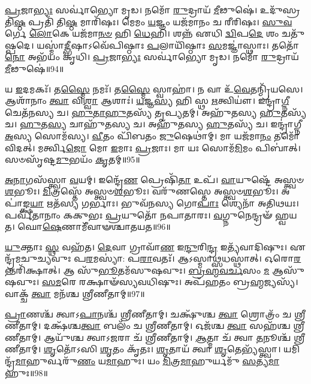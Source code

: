 \-\ul{𑌪𑍍𑌰}\-𑌜𑌾\-\ul{𑌭𑍍𑌯𑌃} 𑌸𑌰𑍍𑌵𑌾॑𑌭𑍍𑌯𑍋 𑌮𑍃𑌡।
𑌨𑌮𑍋᳴ \ul{𑌰𑍁}\-𑌦𑍍𑌰𑌾𑌯᳴ \ul{𑌮𑍀}\-𑌢𑍁𑌷𑍇॑।
𑌉𑌦𑍁᳴𑌸𑍍𑌰 𑌤𑌿\-\ul{𑌷𑍍𑌠} 𑌪𑍍𑌰𑌤𑌿᳴ 𑌤𑌿\-\ul{𑌷𑍍𑌠} 𑌮𑌾𑌰𑌿᳴𑌷𑌃।
𑌮𑍇𑌮𑌂 \ul{𑌯}\-𑌜𑍍𑌞𑌂 𑌯𑌜᳴𑌮𑌾𑌨𑌂 𑌚 𑌰𑍀𑌰𑌿𑌷𑌃।
\-\ul{𑌸𑍁}\-\-\ul{𑌵}\-𑌰𑍍𑌗𑍇 \ul{𑌲𑍋}\-𑌕𑍇 𑌯𑌜᳴𑌮𑌾\-\ul{𑌨}\-\-\ul{𑍞} 𑌹𑌿 \ul{𑌧𑍇}\-𑌹𑌿।
𑌶𑌨𑍍𑌨᳴ 𑌏𑌧𑌿 \ul{𑌦𑍍𑌵𑌿}\-𑌪\-\ul{𑌦𑍇} 𑌶𑌂 𑌚𑌤𑍁᳴𑌷𑍍𑌪𑌦𑍇।
𑌯𑌸𑍍𑌮𑌾॑\-\ul{𑌦𑍍𑌭𑍀}\-𑌷𑌾\-𑌽𑌵𑍇᳴𑌪𑌿𑌷𑍍𑌠𑌾𑌃 \ul{𑌪}\-𑌲𑌾𑌯𑌿᳴𑌷𑍍𑌠𑌾𑌃 \ul{𑌸}\-𑌮𑌜𑍍𑌞𑌾॑𑌸𑍍𑌥𑌾𑌃।
𑌤𑌤𑍋᳴ \ul{𑌨𑍋} 𑌅𑌭᳴𑌯𑌂 𑌕𑍃𑌧𑌿।
\-\ul{𑌪𑍍𑌰}\-𑌜𑌾\-\ul{𑌭𑍍𑌯𑌃} 𑌸𑌰𑍍𑌵𑌾॑𑌭𑍍𑌯𑍋 𑌮𑍃𑌡।
𑌨𑌮𑍋᳴ \ul{𑌰𑍁}\-𑌦𑍍𑌰𑌾𑌯᳴ \ul{𑌮𑍀}\-𑌢𑍁𑌷𑍇॑॥94॥

𑌯 \ul{𑌇}\-𑌦𑌮𑌕𑌃᳴।
𑌤\-\ul{𑌸𑍍𑌮𑍈} 𑌨𑌮𑌃᳴।
𑌤\-\ul{𑌸𑍍𑌮𑍈} 𑌸𑍍𑌵𑌾𑌹𑌾॑।
𑌨 𑌵𑌾 𑌉᳴\-\ul{𑌵𑍇}\-𑌤𑌨𑍍𑌮𑍍𑌰𑌿᳴𑌯𑌸𑍇।
𑌆𑌶𑌾᳴𑌨𑌾𑌂 \ul{𑌤𑍍𑌵𑌾} 𑌵𑌿\-\ul{𑌶𑍍𑌵𑌾} 𑌆𑌶𑌾𑌃॑।
\-\ul{𑌯}\-𑌜𑍍𑌞\-\ul{𑌸𑍍𑌯} 𑌹𑌿 𑌸𑍍𑌥 \ul{𑌋}\-𑌤𑍍𑌵𑌿𑌯𑍗॑।
𑌇𑌨𑍍𑌦𑍍𑌰𑌾॑\-\ul{𑌗𑍍𑌨𑍀} 𑌚𑍇𑌤᳴𑌨𑌸𑍍𑌯 𑌚।
\-\ul{𑌹𑍁}\-\-\ul{𑌤𑌾}\-\-\ul{𑌹𑍁}\-𑌤𑌸𑍍𑌯᳴ 𑌤𑍃𑌪𑍍𑌯𑌤𑌮𑍍।
𑌅𑌹𑍁᳴𑌤𑌸𑍍𑌯 \ul{𑌹𑍁}\-𑌤𑌸𑍍𑌯᳴ 𑌚।
\-\ul{𑌹𑍁}\-𑌤\-\ul{𑌸𑍍𑌯} 𑌚𑌾𑌹𑍁᳴𑌤𑌸𑍍𑌯 𑌚।
𑌅𑌹𑍁᳴𑌤𑌸𑍍𑌯 \ul{𑌹𑍁}\-𑌤𑌸𑍍𑌯᳴ 𑌚।
𑌇𑌨𑍍𑌦𑍍𑌰𑌾॑𑌗𑍍𑌨𑍀 \ul{𑌅}\-𑌸𑍍𑌯 𑌸𑍋𑌮᳴𑌸𑍍𑌯।
\-\ul{𑌵𑍀}\-𑌤𑌂 𑌪𑌿᳴𑌬𑌤𑌂 \ul{𑌜𑍁}\-𑌷𑍇𑌥𑌾॑𑌮𑍍।
𑌮𑌾 𑌯𑌜᳴𑌮𑌾\-\ul{𑌨𑌂} 𑌤𑌮𑍋᳴ 𑌵𑌿𑌦𑌤𑍍।
𑌮𑌰𑍍𑌤𑍍𑌵𑌿\-\ul{𑌜𑍋} 𑌮𑍋 \ul{𑌇}\-𑌮𑌾𑌃 \ul{𑌪𑍍𑌰}\-𑌜𑌾𑌃।
𑌮𑌾 𑌯𑌃 𑌸𑍋𑌮᳴\-\ul{𑌮𑌿}\-𑌮𑌂 𑌪𑌿𑌬𑌾॑𑌤𑍍।
𑌸𑍞𑌸𑍃᳴𑌷𑍍𑌟\-\ul{𑌮𑍁}\-𑌭𑌯𑌂᳴ \ul{𑌕𑍃}\-𑌤𑌮𑍍॥95॥\anuvakamend[\-\ul{𑌕𑍃}\-\-\ul{𑌧𑌿} \ul{𑌮𑍀}\-𑌢𑍁𑌷𑍇\-𑌽𑌹𑍁᳴𑌤𑌸𑍍𑌯 𑌚 \ul{𑌸}\-𑌪𑍍𑌤 𑌚᳴]

\-\ul{𑌅}\-\-\ul{𑌨𑌾}\-𑌗𑌸᳴𑌸𑍍𑌤𑍍𑌵𑌾 \ul{𑌵}\-𑌯𑌮𑍍।
𑌇𑌨𑍍𑌦𑍍𑌰𑍇᳴\-\ul{𑌣} 𑌪𑍍𑌰𑍇𑌷𑌿᳴\-\ul{𑌤𑌾} 𑌉𑌪᳴।
\-\ul{𑌵𑌾}\-𑌯𑍁𑌷𑍍𑌟𑍇᳴ 𑌅𑌸𑍍𑌤𑍍𑌵𑍞\-\ul{𑌶}\-𑌭𑍂𑌃।
\-\ul{𑌮𑌿}\-𑌤𑍍𑌰𑌸𑍍𑌤𑍇᳴ 𑌅𑌸𑍍𑌤𑍍𑌵𑍞\-\ul{𑌶}\-𑌭𑍂𑌃।
𑌵𑌰𑍁᳴𑌣𑌸𑍍𑌤𑍇 𑌅𑌸𑍍𑌤𑍍𑌵𑍞\-\ul{𑌶}\-𑌭𑍂𑌃।
𑌅𑌪𑌾॑𑌙𑍍𑌕𑍍𑌷\-\ul{𑌯𑌾} 𑌋𑌤᳴𑌸𑍍𑌯 𑌗𑌰𑍍𑌭𑌾𑌃।
𑌭𑍁𑌵᳴𑌨𑌸𑍍𑌯 𑌗𑍋\-\ul{𑌪𑌾𑌃} 𑌶𑍍𑌯𑍇𑌨𑌾᳴ 𑌅𑌤𑌿𑌥𑌯𑌃।
𑌪𑌰𑍍𑌵᳴𑌤𑌾𑌨𑌾𑌂 𑌕𑌕𑍁𑌭𑌃 \ul{𑌪𑍍𑌰}\-𑌯𑍁𑌤𑍋᳴ 𑌨𑌪𑌾𑌤𑌾𑌰𑌃।
\-\ul{𑌵}\-𑌗𑍍𑌨𑍁𑌨𑍇𑌨𑍍𑌦𑍍𑌰𑍟᳴ 𑌹𑍍𑌵𑌯𑌤।
𑌘𑍋\-\ul{𑌷𑍇}\-𑌣𑌾𑌮𑍀᳴𑌵𑌾𑍟𑌶𑍍𑌚𑌾𑌤𑌯𑌤॥96॥

\-\ul{𑌯𑍁}\-𑌕𑍍𑌤𑌾𑌃 \ul{𑌸𑍍𑌥} 𑌵𑌹᳴𑌤।
\-\ul{𑌦𑍇}\-𑌵𑌾 𑌗𑍍𑌰𑌾𑌵𑌾᳴\-\ul{𑌣} 𑌇\-\ul{𑌨𑍍𑌦𑍁}\-𑌰𑌿\-\ul{𑌨𑍍𑌦𑍍𑌰} 𑌇𑌤𑍍𑌯᳴𑌵𑌾𑌦𑌿𑌷𑍁𑌃।
𑌏𑌨𑍍𑌦𑍍𑌰᳴𑌮𑌚𑍁𑌚𑍍𑌯𑌵𑍁𑌃 𑌪\-\ul{𑌰}\-𑌮𑌸𑍍𑌯𑌾॑: 𑌪\-\ul{𑌰𑌾}\-𑌵𑌤𑌃᳴।
𑌆𑌽𑌸𑍍𑌮𑌾\-\ul{𑌥𑍍𑌸}\-𑌧𑌸𑍍𑌥𑌾॑𑌤𑍍।
𑌓𑌰𑍋\-\ul{𑌰}\-𑌨𑍍𑌤𑌰𑌿᳴𑌕𑍍𑌷𑌾𑌤𑍍।
𑌆 𑌸𑍁᳴\-\ul{𑌭𑍂}\-𑌤𑌮᳴𑌸𑍁𑌷𑌵𑍁𑌃।
\-\ul{𑌬𑍍𑌰}\-\-\ul{𑌹𑍍𑌮}\-\-\ul{𑌵}\-\-\ul{𑌰𑍍𑌚}\-𑌸𑌂 \ul{𑌮} 𑌆𑌸𑍁᳴𑌷𑌵𑍁𑌃।
\-\ul{𑌸}\-\-\ul{𑌮}\-𑌰𑍇 𑌰𑌕𑍍𑌷𑌾𑍟᳴𑌸𑍍𑌯𑌵𑌧𑌿𑌷𑍁𑌃।
𑌅𑌪᳴𑌹𑌤𑌂 𑌬𑍍𑌰\-\ul{𑌹𑍍𑌮}\-𑌜𑍍𑌯𑌸𑍍𑌯᳴।
𑌵𑌾𑌕𑍍𑌚᳴ \ul{𑌤𑍍𑌵𑌾} 𑌮𑌨᳴𑌶𑍍𑌚 𑌶𑍍𑌰𑍀𑌣𑍀𑌤𑌾𑌮𑍍॥97॥

\-\ul{𑌪𑍍𑌰𑌾}\-𑌣𑌶𑍍𑌚᳴ 𑌤𑍍𑌵𑌾\-𑌽\-\ul{𑌪𑌾}\-𑌨𑌶𑍍𑌚᳴ 𑌶𑍍𑌰𑍀𑌣𑍀𑌤𑌾𑌮𑍍।
𑌚𑌕𑍍𑌷𑍁᳴𑌶𑍍𑌚 \ul{𑌤𑍍𑌵𑌾} 𑌶𑍍𑌰𑍋𑌤𑍍𑌰𑌂᳴ 𑌚 𑌶𑍍𑌰𑍀𑌣𑍀𑌤𑌾𑌮𑍍।
𑌦𑌕𑍍𑌷᳴𑌶𑍍𑌚\-\ul{𑌤𑍍𑌵𑌾} 𑌬𑌲𑌂᳴ 𑌚 𑌶𑍍𑌰𑍀𑌣𑍀𑌤𑌾𑌮𑍍।
𑌓𑌜᳴𑌶𑍍𑌚 \ul{𑌤𑍍𑌵𑌾} 𑌸𑌹᳴𑌶𑍍𑌚 𑌶𑍍𑌰𑍀𑌣𑍀𑌤𑌾𑌮𑍍।
𑌆𑌯𑍁᳴𑌶𑍍𑌚 𑌤𑍍𑌵𑌾\-𑌽\-\ul{𑌜}\-𑌰𑌾 𑌚᳴ 𑌶𑍍𑌰𑍀𑌣𑍀𑌤𑌾𑌮𑍍।
\-\ul{𑌆}\-𑌤𑍍𑌮𑌾 𑌚᳴ 𑌤𑍍𑌵𑌾 \ul{𑌤}\-𑌨𑍂𑌶𑍍𑌚᳴ 𑌶𑍍𑌰𑍀𑌣𑍀𑌤𑌾𑌮𑍍।
\-\ul{𑌶𑍃}\-𑌤𑍋᳴𑌽𑌸𑌿 \ul{𑌶𑍃}\-𑌤𑌂 𑌕𑍃᳴𑌤𑌃।
\-\ul{𑌶𑍃}\-𑌤𑌾𑌯᳴ 𑌤𑍍𑌵𑌾 \ul{𑌶𑍃}\-𑌤𑍇𑌭𑍍𑌯᳴𑌸𑍍𑌤𑍍𑌵𑌾।
𑌯𑌮𑌿𑌨𑍍𑌦𑍍𑌰᳴\-\ul{𑌮𑌾}\-𑌹𑍁𑌰𑍍𑌵𑌰𑍁᳴\-\ul{𑌣𑌂} 𑌯\-\ul{𑌮𑌾}\-𑌹𑍁𑌃।
𑌯𑌂 \ul{𑌮𑌿}\-𑌤𑍍𑌰\-\ul{𑌮𑌾}\-𑌹𑍁𑌰𑍍𑌯𑌮𑍁᳴ \ul{𑌸}\-𑌤𑍍𑌯\-\ul{𑌮𑌾}\-𑌹𑍁𑌃॥98॥

